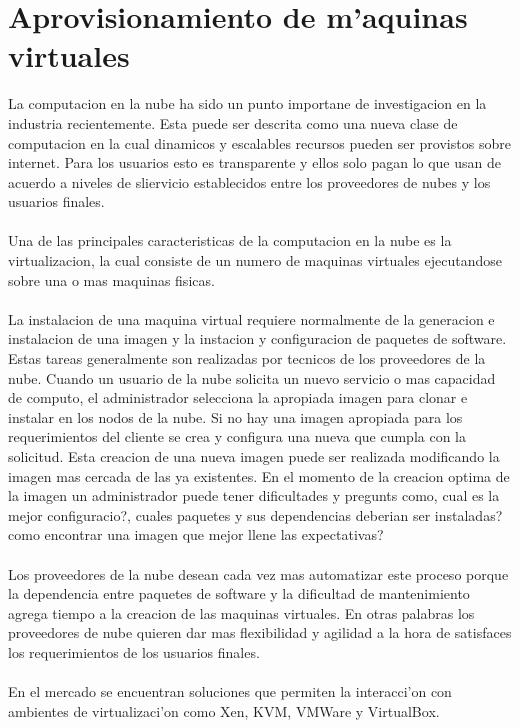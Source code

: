 \chapter{Aprovisionamiento de m'aquinas virtuales}
\label{aprmaqvir}
La computacion en la nube ha sido un punto importane de investigacion en la industria recientemente. Esta puede ser descrita como una nueva clase de computacion en la cual dinamicos y escalables recursos pueden ser provistos sobre internet. Para los usuarios esto es transparente y ellos solo pagan lo que usan de acuerdo a niveles de sliervicio establecidos entre los proveedores de nubes y los usuarios finales. \\
\\
Una de las principales caracteristicas de la computacion en la nube es la virtualizacion, la cual consiste de un numero de maquinas virtuales ejecutandose sobre una o mas maquinas fisicas. \\
\\
La instalacion de una maquina virtual requiere normalmente de la generacion e instalacion de una imagen y la instacion y configuracion de paquetes de software. Estas tareas generalmente son realizadas por tecnicos de los proveedores de la nube. Cuando un usuario de la nube solicita un nuevo servicio o mas capacidad de computo, el administrador selecciona la apropiada imagen para clonar e instalar en los nodos de la nube. Si no hay una imagen apropiada para los requerimientos del cliente se crea y configura una nueva que cumpla con la solicitud. Esta creacion de una nueva imagen puede ser realizada modificando la imagen mas cercada de las ya existentes. En el momento de la creacion optima de la imagen un administrador puede tener dificultades y pregunts como, cual es la mejor configuracio?, cuales paquetes y sus dependencias deberian ser instaladas? como encontrar una imagen que mejor llene las expectativas?\\
\\
Los proveedores de la nube desean cada vez mas automatizar este proceso porque la dependencia entre paquetes de software y la dificultad de mantenimiento agrega tiempo a la creacion de las maquinas virtuales. En otras palabras los proveedores de nube quieren dar mas flexibilidad y agilidad a la hora de satisfaces los requerimientos de los usuarios finales.\\
\\
En el mercado se encuentran soluciones que permiten la interacci'on con ambientes de virtualizaci'on como Xen, KVM, VMWare y VirtualBox.\\
